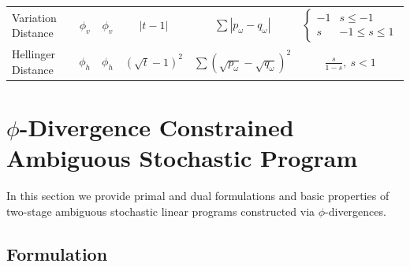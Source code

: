 \documentclass[opre,nonblindrev]{informs3} %
\begin{document}
\begin{table}
{\begin{tabular}{lccccc}
		Variation Distance                & $\phi_v$           & $\phi_v$                        & $|t-1|$               & $\sum |p_\omega - q_\omega|$                               & $\begin{cases} -1 & s \leq -1 \\ s & -1 \leq s \leq 1 \end{cases}$ \\
		Hellinger Distance                & $\phi_h$           & $\phi_h$                        & $(\sqrt{t} - 1)^2$    & $\sum (\sqrt{p_\omega} - \sqrt{q_\omega})^2$               & $\frac{s}{1-s},\ s < 1$ \\
	\hline
	\end{tabular}}
	{}
\end{table}

\section{$\phi$-Divergence Constrained Ambiguous Stochastic Program}
\label{sec:plp2}

In this section we provide primal and dual formulations and basic properties of two-stage ambiguous stochastic linear programs constructed via $\phi$-divergences.

\subsection{Formulation}
\label{ssec:form}
\end{document}
